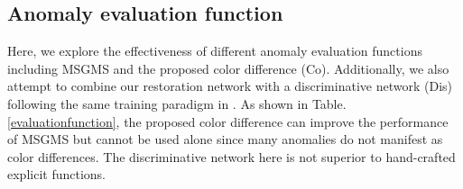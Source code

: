 \documentclass[5p, twocolumn]{elsarticle}[draft]
\begin{document}
\begin{table}[h]
\caption{Quantitative comparison of the anomaly detection performance with different variants of the Sobel gradient operators. I-AUROC and P-AUROC refer to image-level and pixel-level AUROC respectively. The normal reconstruction errors (Normal errors) are evaluated with MSE in units of 1e-4.}
\end{table}

\subsection{Anomaly evaluation function}
Here, we explore the effectiveness of different anomaly evaluation functions including MSGMS and the proposed color difference (Co). Additionally, we also attempt to combine our restoration network with a discriminative network (Dis) following the same training paradigm in \cite{zavrtanik2021draem}. As shown in Table. \ref{evaluationfunction}, the proposed color difference can improve the performance of MSGMS but cannot be used alone since many anomalies do not manifest as color differences. The discriminative network here is not superior to hand-crafted explicit functions.

\begin{table}[h]
\caption{Quantitative comparison of the anomaly detection performance of our method with different anomaly evaluation functions. I-AUROC and P-AUROC refer to image-level and pixel-level AUROC respectively.}
\end{table}
\end{document}
